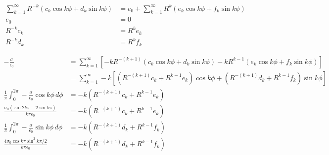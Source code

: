 \documentclass{article}
\begin{document}
\begin{align*}
  \sum_{k = 1}^\infty R^{-k} (c_k \cos k \phi + d_k \sin k \phi)                                                           & = e_0 + \sum_{k = 1}^\infty R^k (e_k \cos k \phi + f_k \sin k \phi)       \\
  e_0                                                                                                                      & = 0                                                                       \\
  R^{-k} c_k                                                                                                               & = R^k e_k                                                                 \\
  R^{-k} d_k                                                                                                               & = R^k f_k
\end{align*}

\begin{align*}
  -\frac{\sigma}{\epsilon_0}                                                   & = \sum_{k = 1}^\infty \left[ -k R^{-(k + 1)} (c_k \cos k \phi + d_k \sin k \phi) - k R^{k - 1} (e_k \cos k \phi + f_k \sin k \phi) \right]                        \\
                                                                               & = \sum_{k = 1}^\infty -k \left[ \left( R^{-(k + 1)} c_k + R^{k - 1} e_k \right) \cos k \phi + \left( R^{-(k + 1)} d_k + R^{k - 1} f_k \right) \sin k \phi \right] \\
  \frac{1}{\pi} \int_0^{2 \pi} -\frac{\sigma}{\epsilon_0} \cos k \phi \,d \phi & = -k (R^{-(k + 1)} c_k + R^{k - 1} e_k)                                                                                                                           \\
  \frac{\sigma_0 (\sin 2 k \pi - 2 \sin k \pi)}{k \pi \epsilon_0}              & = -k (R^{-(k + 1)} c_k + R^{k - 1} e_k)                                                                                                                           \\
  \frac{1}{\pi} \int_0^{2 \pi} -\frac{\sigma}{\epsilon_0} \sin k \phi \,d \phi & = -k (R^{-(k + 1)} d_k + R^{k - 1} f_k)                                                                                                                           \\
  \frac{4 \sigma_0 \cos k \pi \sin^2 k \pi / 2}{k \pi \epsilon_0}              & = -k (R^{-(k + 1)} d_k + R^{k - 1} f_k)
\end{align*}
\end{document}

